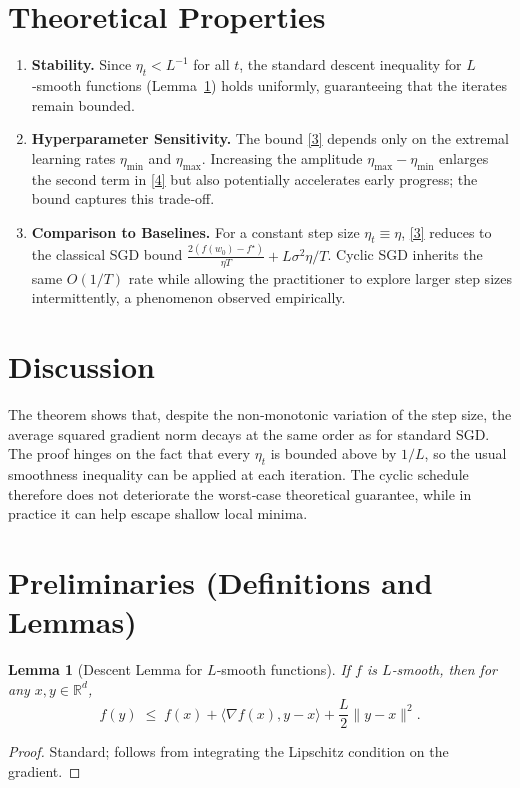 \documentclass{article}
\newtheorem{lemma}{Lemma}
\begin{document}
\section*{Theoretical Properties}
\begin{enumerate}[label=\arabic*.]
\item \textbf{Stability.} Since $\eta_t<L^{-1}$ for all $t$, the standard descent
inequality for $L$‑smooth functions (Lemma~\ref{lem:descent}) holds uniformly, guaranteeing that the iterates remain bounded.
\item \textbf{Hyperparameter Sensitivity.}
The bound \eqref{3} depends only on the extremal learning rates
$\eta_{\min}$ and $\eta_{\max}$.  Increasing the amplitude
$\eta_{\max}-\eta_{\min}$ enlarges the second term in \eqref{4} but also
potentially accelerates early progress; the bound captures this trade‑off.
\item \textbf{Comparison to Baselines.}
For a constant step size $\eta_t\equiv\eta$, \eqref{3} reduces to the classical
SGD bound $\frac{2(f(w_0)-f^\star)}{\eta T}+L\sigma^2\eta/T$.
Cyclic SGD inherits the same $O(1/T)$ rate while allowing the practitioner
to explore larger step sizes intermittently, a phenomenon observed empirically.
\end{enumerate}

\section*{Discussion}
The theorem shows that, despite the non‑monotonic variation of the step size,
the average squared gradient norm decays at the same order as for standard SGD.
The proof hinges on the fact that every $\eta_t$ is bounded above by $1/L$,
so the usual smoothness inequality can be applied at each iteration.
The cyclic schedule therefore does not deteriorate the worst‑case theoretical
guarantee, while in practice it can help escape shallow local minima.

\newpage
\section*{Preliminaries (Definitions and Lemmas)}
\begin{lemma}[Descent Lemma for $L$‑smooth functions]\label{lem:descent}
If $f$ is $L$‑smooth, then for any $x,y\in\mathbb{R}^d$,
\[
f(y)\;\le\; f(x)+\langle\nabla f(x),y-x\rangle+\frac{L}{2}\|y-x\|^2 .
\]
\end{lemma}
\begin{proof}
Standard; follows from integrating the Lipschitz condition on the gradient.
\end{proof}
\end{document}
